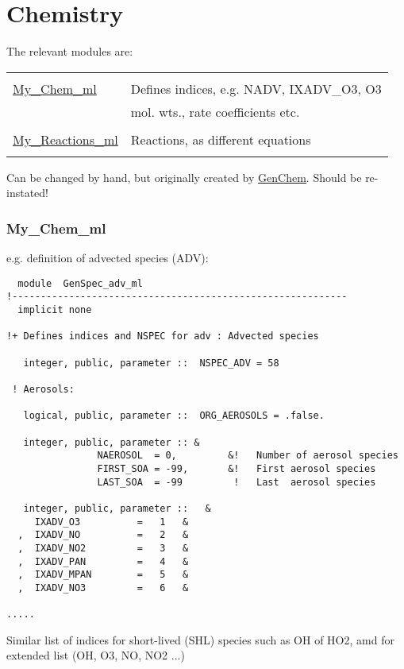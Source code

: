 \chapter{Chemistry}

The relevant modules are:
\bigskip

\begin{tabular}{ll}
\hline
 & \\
\url{My_Chem_ml}    &  Defines indices, e.g. NADV, IXADV\_O3, O3 \\
                    &  mol. wts., rate coefficients etc. \\
                    & \\
\url{My_Reactions_ml}  &  Reactions, as different equations \\
 & \\
\hline
\end{tabular}


Can be changed by hand, but originally created by \url{GenChem}.
Should be re-instated!


\subsection*{My\_Chem\_ml}

e.g. definition of advected species (ADV):

\begin{verbatim}
  module  GenSpec_adv_ml
!-----------------------------------------------------------
  implicit none

!+ Defines indices and NSPEC for adv : Advected species

   integer, public, parameter ::  NSPEC_ADV = 58

 ! Aerosols:

   logical, public, parameter ::  ORG_AEROSOLS = .false.

   integer, public, parameter :: &
                NAEROSOL  = 0,         &!   Number of aerosol species
                FIRST_SOA = -99,       &!   First aerosol species
                LAST_SOA  = -99         !   Last  aerosol species

   integer, public, parameter ::   &
     IXADV_O3          =   1   &
  ,  IXADV_NO          =   2   &
  ,  IXADV_NO2         =   3   &
  ,  IXADV_PAN         =   4   &
  ,  IXADV_MPAN        =   5   &
  ,  IXADV_NO3         =   6   &

.....
\end{verbatim}

Similar list of indices for short-lived (SHL) species
such as OH of HO2, amd for extended list (OH, O3, NO, NO2 ...)

